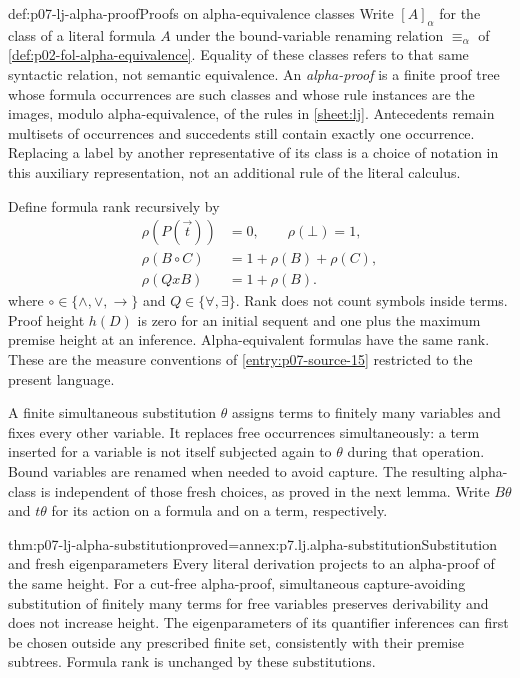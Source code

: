 \begin{hbdefinition}{def:p07-lj-alpha-proof}{Proofs on alpha-equivalence classes}
Write \([A]_\alpha\) for the class of a literal formula \(A\) under the
bound-variable renaming relation \(\equiv_\alpha\) of
\ref{def:p02-fol-alpha-equivalence}. Equality of these classes refers to
that same syntactic relation, not semantic equivalence. An \emph{alpha-proof} is a finite
proof tree whose formula occurrences are such classes and whose rule
instances are the images, modulo alpha-equivalence, of the rules in
\ref{sheet:lj}.  Antecedents remain multisets of occurrences and succedents
still contain exactly one occurrence.  Replacing a label by another
representative of its class is a choice of notation in this auxiliary
representation, not an additional rule of the literal calculus.

Define formula rank recursively by
\[
 \begin{aligned}
 \rho(P(\vec t))&=0,\qquad \rho(\bot)=1,\\
 \rho(B\circ C)&=1+\rho(B)+\rho(C),\\
 \rho(QxB)&=1+\rho(B).
 \end{aligned}
\]
where \(\circ\in\{\land,\lor,\to\}\) and
\(Q\in\{\forall,\exists\}\).  Rank does not count symbols inside terms.
Proof height \(h(D)\) is zero for an initial sequent and one plus the
maximum premise height at an inference.  Alpha-equivalent formulas have
the same rank.  These are the measure conventions of
\ref{entry:p07-source-15} restricted to the present language.

A finite simultaneous substitution \(\theta\) assigns terms to
finitely many variables and fixes every other variable.  It replaces
free occurrences simultaneously: a term inserted for a variable is
not itself subjected again to \(\theta\) during that operation.
Bound variables are renamed when needed to avoid capture.  The
resulting alpha-class is independent of those fresh choices, as proved
in the next lemma.  Write \(B\theta\) and \(t\theta\) for its action
on a formula and on a term, respectively.
\end{hbdefinition}

\begin{hblemma}{thm:p07-lj-alpha-substitution}{proved=annex:p7.lj.alpha-substitution}{Substitution and fresh eigenparameters}
Every literal derivation projects to an alpha-proof of the same height.
For a cut-free alpha-proof, simultaneous capture-avoiding substitution of
finitely many terms for free variables preserves derivability and does not
increase height.  The eigenparameters of its quantifier inferences can
first be chosen outside any prescribed finite set, consistently with their
premise subtrees.  Formula rank is unchanged by these substitutions.
\end{hblemma}

